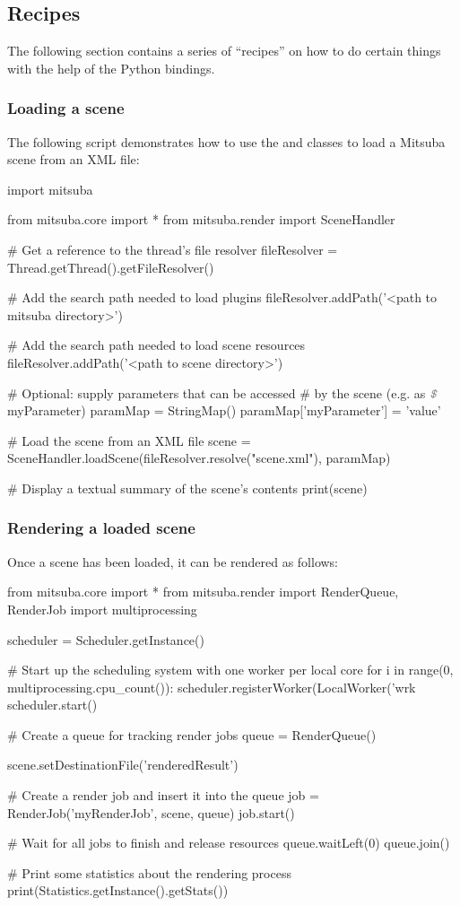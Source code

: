\subsection{Recipes}
The following section contains a series of ``recipes'' on how to do
certain things with the help of the Python bindings.

\subsubsection{Loading a scene}
The following script demonstrates how to use the
 and  classes to 
load a Mitsuba scene from an XML file:
\begin{python}
import mitsuba

from mitsuba.core import *
from mitsuba.render import SceneHandler

# Get a reference to the thread's file resolver
fileResolver = Thread.getThread().getFileResolver()

# Add the search path needed to load plugins
fileResolver.addPath('<path to mitsuba directory>')

# Add the search path needed to load scene resources
fileResolver.addPath('<path to scene directory>')

# Optional: supply parameters that can be accessed 
# by the scene (e.g. as $\text{\color{lstcomment}\itshape\texttt{\$}}$myParameter)
paramMap = StringMap()
paramMap['myParameter'] = 'value'

# Load the scene from an XML file
scene = SceneHandler.loadScene(fileResolver.resolve("scene.xml"), paramMap)

# Display a textual summary of the scene's contents
print(scene)
\end{python}

\subsubsection{Rendering a loaded scene}
Once a scene has been loaded, it can be rendered as follows:
\begin{python}
from mitsuba.core import *
from mitsuba.render import RenderQueue, RenderJob
import multiprocessing

scheduler = Scheduler.getInstance()

# Start up the scheduling system with one worker per local core
for i in range(0, multiprocessing.cpu_count()):
	scheduler.registerWorker(LocalWorker('wrk%
scheduler.start()

# Create a queue for tracking render jobs
queue = RenderQueue()

scene.setDestinationFile('renderedResult')

# Create a render job and insert it into the queue
job = RenderJob('myRenderJob', scene, queue)
job.start()

# Wait for all jobs to finish and release resources
queue.waitLeft(0)
queue.join()

# Print some statistics about the rendering process
print(Statistics.getInstance().getStats())
\end{python}

